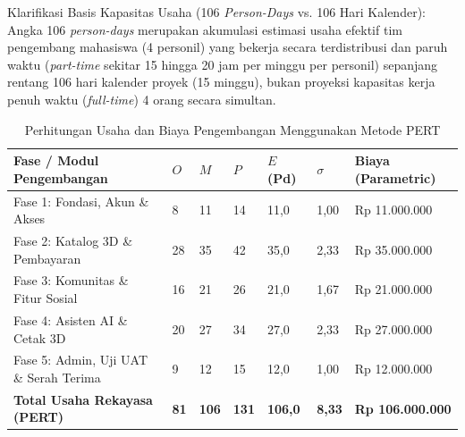 \documentclass[11pt,a4paper]{article}
\newcommand{\thdr}[1]{\centering\arraybackslash\textbf{#1}}
\begin{document}
\noindent Klarifikasi Basis Kapasitas Usaha (106 \textit{Person-Days} vs. 106 Hari Kalender):
Angka 106 \textit{person-days} merupakan akumulasi estimasi usaha efektif tim pengembang mahasiswa (4 personil) yang bekerja secara terdistribusi dan paruh waktu (\textit{part-time} sekitar 15 hingga 20 jam per minggu per personil) sepanjang rentang 106 hari kalender proyek (15 minggu), bukan proyeksi kapasitas kerja penuh waktu (\textit{full-time}) 4 orang secara simultan.

\begin{table}[H]
\centering
\caption{Perhitungan Usaha dan Biaya Pengembangan Menggunakan Metode PERT}
\small
\begin{tabularx}{\textwidth}{| Y | C{0.8cm} | C{0.8cm} | C{0.8cm} | C{1.6cm} | C{1.0cm} | R{3.1cm} |}
\hline
{} \thdr{Fase / Modul Pengembangan} & \thdr{$O$} & \thdr{$M$} & \thdr{$P$} & \thdr{$E$ (Pd)} & \thdr{$\sigma$} & \thdr{Biaya (Parametric)} \\
\hline
Fase 1: Fondasi, Akun \& Akses & 8 & 11 & 14 & 11,0 & 1,00 & Rp 11.000.000 \\
\hline
Fase 2: Katalog 3D \& Pembayaran & 28 & 35 & 42 & 35,0 & 2,33 & Rp 35.000.000 \\
\hline
Fase 3: Komunitas \& Fitur Sosial & 16 & 21 & 26 & 21,0 & 1,67 & Rp 21.000.000 \\
\hline
Fase 4: Asisten AI \& Cetak 3D & 20 & 27 & 34 & 27,0 & 2,33 & Rp 27.000.000 \\
\hline
Fase 5: Admin, Uji UAT \& Serah Terima & 9 & 12 & 15 & 12,0 & 1,00 & Rp 12.000.000 \\
\hline
{} \textbf{Total Usaha Rekayasa (PERT)} & \textbf{81} & \textbf{106} & \textbf{131} & \textbf{106,0} & \textbf{8,33} & \textbf{Rp 106.000.000} \\
\hline
\end{tabularx}
\end{table}
\end{document}
